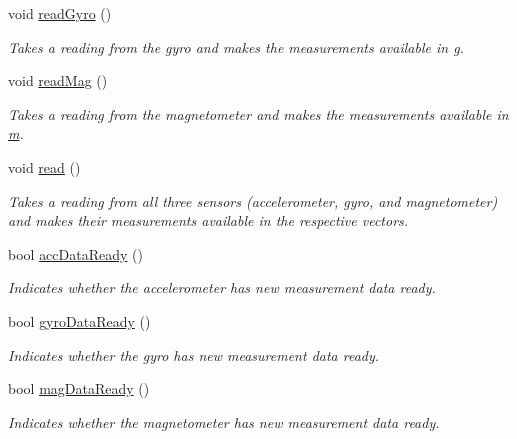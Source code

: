 \begin{DoxyCompactItemize}
void \hyperlink{class_zumo32_u4_i_m_u_a1c460bf87ffc7d671b398bf9ef4951d6}{read\+Gyro} ()
\begin{DoxyCompactList}\small\item\em Takes a reading from the gyro and makes the measurements available in \hyperlink{class_zumo32_u4_i_m_u_a6870acdcde72d4f3ec2bd70088641e4e}{g}. \end{DoxyCompactList}\item 
\mbox{\label{class_zumo32_u4_i_m_u_a83f3ef3030e781ea7cee727190f3bd2d}} 
void \hyperlink{class_zumo32_u4_i_m_u_a83f3ef3030e781ea7cee727190f3bd2d}{read\+Mag} ()
\begin{DoxyCompactList}\small\item\em Takes a reading from the magnetometer and makes the measurements available in \hyperlink{class_zumo32_u4_i_m_u_a667705e0bbee3b4b5ec3a49b2fc72662}{m}. \end{DoxyCompactList}\item 
\mbox{\label{class_zumo32_u4_i_m_u_aad16780f526df9f77614f47427c658ed}} 
void \hyperlink{class_zumo32_u4_i_m_u_aad16780f526df9f77614f47427c658ed}{read} ()
\begin{DoxyCompactList}\small\item\em Takes a reading from all three sensors (accelerometer, gyro, and magnetometer) and makes their measurements available in the respective vectors. \end{DoxyCompactList}\item 
bool \hyperlink{class_zumo32_u4_i_m_u_a75735024206bd09d0905f28455f0a368}{acc\+Data\+Ready} ()
\begin{DoxyCompactList}\small\item\em Indicates whether the accelerometer has new measurement data ready. \end{DoxyCompactList}\item 
bool \hyperlink{class_zumo32_u4_i_m_u_a82a4b99d45afb0b5008e32213fa2e0cc}{gyro\+Data\+Ready} ()
\begin{DoxyCompactList}\small\item\em Indicates whether the gyro has new measurement data ready. \end{DoxyCompactList}\item 
bool \hyperlink{class_zumo32_u4_i_m_u_ad9a7bde2fa435b4ceb6929e73acef4b6}{mag\+Data\+Ready} ()
\begin{DoxyCompactList}\small\item\em Indicates whether the magnetometer has new measurement data ready. \end{DoxyCompactList}\end{DoxyCompactItemize}
